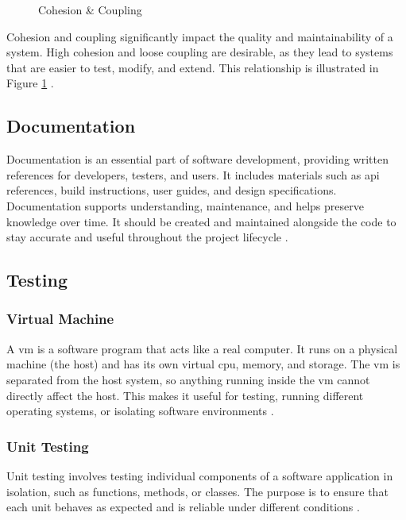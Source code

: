 {\begin{figure}[h!]
    \caption[Cohesion \& Coupling]{Cohesion \& Coupling \cite{geeksforgeeks:c&c}}
    \label{fig:cohesion-coupling}
\end{figure}

Cohesion and coupling significantly impact the quality and maintainability of a system.
High cohesion and loose coupling are desirable, as they lead to systems that are easier to test, modify, and extend. This relationship is illustrated in Figure \ref{fig:cohesion-coupling} 
\cite{geeksforgeeks:c&c}.

\subsection{Documentation}
\label{subsec:documentation}

Documentation is an essential part of software development, providing written references for developers, testers, and users. It includes materials such as \gls{api} references, build instructions, user guides, and design specifications. Documentation supports understanding, maintenance, and helps preserve knowledge over time. It should be created and maintained alongside the code to stay accurate and useful throughout the project lifecycle \cite{geeksforgeeks:doc}.

\subsection{Testing}
\label{subsec:testing}

\subsubsection*{Virtual Machine}
\label{subsubsec:virtual-machine}

A \gls{vm} is a software program that acts like a real computer. It runs on a physical machine (the host) and has its own virtual \gls{cpu}, memory, and storage. The \gls{vm} is separated from the host system, so anything running inside the \gls{vm} cannot directly affect the host. This makes it useful for testing, running different operating systems, or isolating software environments \cite{microsoft:virtual-machine}.

\subsubsection*{Unit Testing}
\label{subsubsec:unit-testing}

Unit testing involves testing individual components of a software application in isolation, such as functions, methods, or classes. The purpose is to ensure that each unit behaves as expected and is reliable under different conditions \cite{geeksforgeeks:unit-test}.

}
